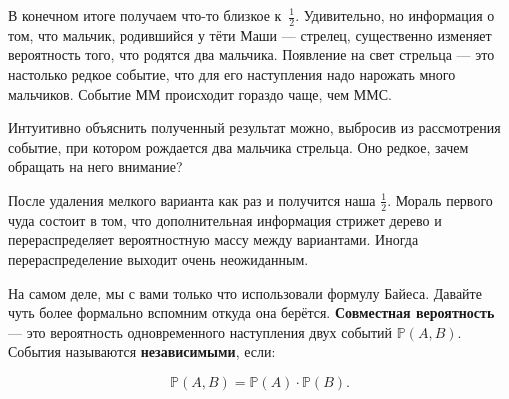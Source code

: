 \documentclass[12pt, a4paper, oneside]{extreport}
\def \mbb{\mathbb}
\def \PP{\mbb{P}}
\newcommand{\indef}[1]{\textbf{#1}}     %
\theoremstyle{plain}              %
\theoremstyle{definition}         %
\begin{document}
В конечном итоге получаем что-то близкое к~$\frac{1}{2}$.  Удивительно, но информация о том, что мальчик, родившийся у тёти Маши --- стрелец, существенно изменяет вероятность того, что родятся два мальчика. Появление на свет стрельца --- это настолько редкое событие, что для его наступления надо нарожать много мальчиков. Событие $\text{ММ}$ происходит гораздо чаще, чем $\text{ММС}$. 

Интуитивно объяснить полученный результат можно, выбросив из рассмотрения событие, при котором рождается два мальчика стрельца. Оно редкое, зачем обращать на него внимание?

\begin{center}
\end{center}

После удаления мелкого варианта как раз и получится наша $\frac{1}{2}$. Мораль первого чуда состоит в том, что дополнительная информация стрижет дерево и перераспределяет вероятностную массу между вариантами. Иногда перераспределение выходит очень неожиданным. 

На самом деле, мы с вами только что использовали формулу Байеса.  Давайте чуть более формально вспомним откуда она берётся.  \indef{Совместная вероятность} --- это вероятность одновременного наступления двух событий  $\PP(A,B)$.  События называются \indef{независимыми}, если:

\[ \PP(A,B) = \PP(A) \cdot \PP(B).\]
\end{document}
